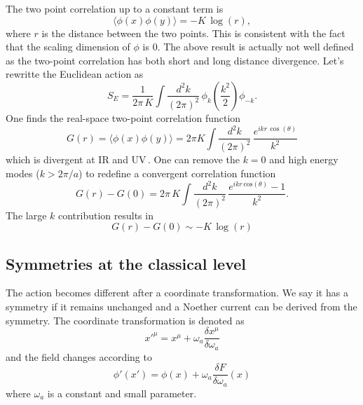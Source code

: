 \documentclass[submission, PhysLectNotes]{SciPost}
\begin{document}
The two point correlation up to a constant term is
\begin{equation}
    \langle \phi(x) \phi(y) \rangle = -K\,\mathrm{\log} (r),
\end{equation}
where $r$ is the distance between the two points. This is consistent with the fact that the scaling dimension of $\phi$ is 0. The above result is actually not well defined as the two-point correlation has both short and long distance divergence. Let's rewritte the Euclidean action as 
\begin{equation}
	S_E = \frac{1}{2\pi\,K} \int\frac{d^2k}{(2\pi)^2} \, \phi_k \left(\frac{k^2}{2}\right)\phi_{-k}.
\end{equation} 
One finds the real-space two-point correlation function
\begin{equation}
	G(r) = \langle \phi(x) \phi(y) \rangle = 2\pi K \int \frac{d^2k}{(2\pi)^2}\, \frac{e^{ikr\,\cos(\theta)}}{k^2}
\end{equation}
which is divergent at IR and UV\,. One can remove the $k=0$ and high energy modes ($k>2\pi/a$) to redefine a convergent correlation function 
\begin{equation}
	G(r) - G(0) = 2\pi\,K \int \frac{d^2k}{(2\pi)^2}\, \frac{e^{ikr\,\mathrm{cos}(\theta)}-1}{k^2}.
\end{equation}
The large $k$ contribution results in
\begin{equation}
	G(r) - G(0) \sim -K\,\log(r)
\end{equation}





\subsection{Symmetries at the classical level}
The action becomes different after a coordinate transformation. We say it has a symmetry if it remains unchanged and a Noether current can be derived from the symmetry. The coordinate transformation is denoted as
\begin{equation}
    x'^\mu = x^\mu + \omega_a \frac{\delta x^\mu}{\delta \omega_a}
\end{equation}
and the field changes according to
\begin{equation}
    \phi'(x') = \phi(x) + \omega_a \frac{\delta F}{\delta \omega_a}(x)
\end{equation}
where $\omega_a$ is a constant and small parameter.
\end{document}
